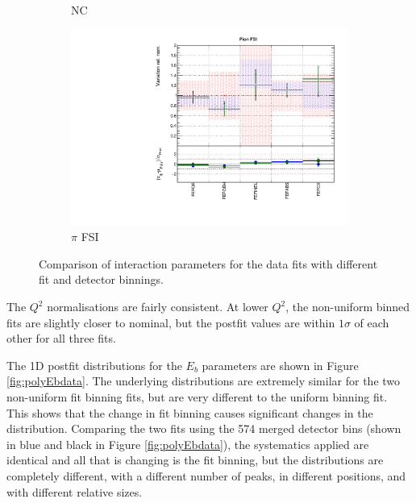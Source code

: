 \begin{figure}[!htbp]
\begin{subfigure}{0.49\textwidth}
  \caption{NC}
\end{subfigure}
\begin{subfigure}{0.49\textwidth}
  \centering
  \includegraphics[width=0.9\linewidth]{figs/polydataxsec_5}
  \caption{$\pi$ FSI}
\end{subfigure}
\caption{Comparison of interaction parameters for the data fits with different fit and detector binnings.}
\label{fig:polydataxsec}
\end{figure}

The $Q^2$ normalisations are fairly consistent. At lower $Q^2$, the non-uniform binned fits are slightly closer to nominal, but the postfit values are within $1\sigma$ of each other for all three fits. 

The 1D postfit distributions for the $E_b$ parameters are shown in Figure \ref{fig:polyEbdata}. The underlying distributions are extremely similar for the two non-uniform fit binning fits, but are very different to the uniform binning fit. This shows that the change in fit binning causes significant changes in the distribution. Comparing the two fits using the 574 merged detector bins (shown in blue and black in Figure \ref{fig:polyEbdata}), the systematics applied are identical and all that is changing is the fit binning, but the distributions are completely different, with a different number of peaks, in different positions, and with different relative sizes. 


